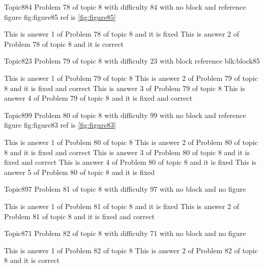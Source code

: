 \documentclass[master]{exam}
\begin{document}
\begin{problem}{Topic8}{84}
	Problem 78 of topic 8 with difficulty 84 with no block and reference figure fig:figure85 ref is \ref{fig:figure85}
	\begin{answers}
		\answer[fixed] This is answer 1 of Problem 78 of topic 8 and it is fixed
		\answer[correct] This is answer 2 of Problem 78 of topic 8 and it is correct
	\end{answers}
\end{problem}

\begin{problem}[requires=blk:block85]{Topic8}{23}
	Problem 79 of topic 8 with difficulty 23 with block reference blk:block85
	\begin{answers}
		\answer This is answer 1 of Problem 79 of topic 8 
		 This is answer 2 of Problem 79 of topic 8 and it is fixed and correct
		\answer This is answer 3 of Problem 79 of topic 8 
		 This is answer 4 of Problem 79 of topic 8 and it is fixed and correct
	\end{answers}
\end{problem}

\begin{problem}{Topic8}{99}
	Problem 80 of topic 8 with difficulty 99 with no block and reference figure fig:figure83 ref is \ref{fig:figure83}
	\begin{answers}
		\answer This is answer 1 of Problem 80 of topic 8 
		 This is answer 2 of Problem 80 of topic 8 and it is fixed and correct
		 This is answer 3 of Problem 80 of topic 8 and it is fixed and correct
		\answer[fixed] This is answer 4 of Problem 80 of topic 8 and it is fixed
		\answer[fixed] This is answer 5 of Problem 80 of topic 8 and it is fixed
	\end{answers}
\end{problem}

\begin{problem}{Topic8}{97}
	Problem 81 of topic 8 with difficulty 97 with no block and no figure
	\begin{answers}
		\answer[fixed] This is answer 1 of Problem 81 of topic 8 and it is fixed
		 This is answer 2 of Problem 81 of topic 8 and it is fixed and correct
	\end{answers}
\end{problem}

\begin{problem}{Topic8}{71}
	Problem 82 of topic 8 with difficulty 71 with no block and no figure
	\begin{answers}
		\answer This is answer 1 of Problem 82 of topic 8 
		\answer[correct] This is answer 2 of Problem 82 of topic 8 and it is correct
	\end{answers}
\end{problem}
\end{document}
